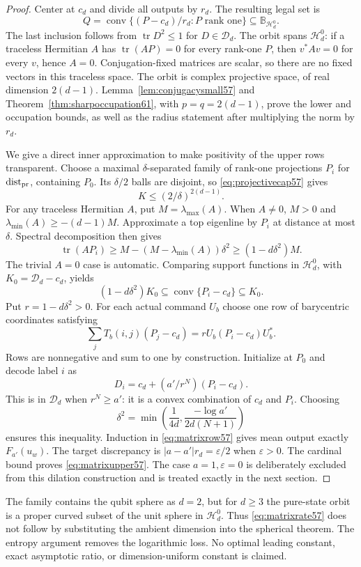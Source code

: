 \begin{proof}
Center at $c_d$ and divide all outputs by $r_d$. The resulting legal set is
\[
 Q=\operatorname{conv}\{(P-c_d)/r_d:P\text{ rank one}\}\subseteq\mathbb B_{\mathcal H_d^0}.
\]
The last inclusion follows from $\operatorname{tr}D^2\le1$ for $D\in\mathcal D_d$. The orbit spans $\mathcal H_d^0$: if a traceless Hermitian $A$ has $\operatorname{tr}(AP)=0$ for every rank-one $P$, then $v^*Av=0$ for every $v$, hence $A=0$. Conjugation-fixed matrices are scalar, so there are no fixed vectors in this traceless space. The orbit is complex projective space, of real dimension $2(d-1)$. Lemma~\ref{lem:conjugacysmall57} and Theorem~\ref{thm:sharpoccupation61}, with $p=q=2(d-1)$, prove the lower and occupation bounds, as well as the radius statement after multiplying the norm by $r_d$.

We give a direct inner approximation to make positivity of the upper rows transparent. Choose a maximal $\delta$-separated family of rank-one projections $P_i$ for $\operatorname{dist}_{\rm pr}$, containing $P_0$. Its $\delta/2$ balls are disjoint, so \eqref{eq:projectivecap57} gives
\[
                         K\le(2/\delta)^{2(d-1)}.
\]
For any traceless Hermitian $A$, put $M=\lambda_{\max}(A)$. When $A\ne0$, $M>0$ and $\lambda_{\min}(A)\ge-(d-1)M$. Approximate a top eigenline by $P_i$ at distance at most $\delta$. Spectral decomposition then gives
\begin{equation}\label{eq:matrixsupport57}
 \operatorname{tr}(AP_i)\ge M-(M-\lambda_{\min}(A))\delta^2
                         \ge(1-d\delta^2)M.
\end{equation}
The trivial $A=0$ case is automatic. Comparing support functions in $\mathcal H_d^0$, with $K_0=\mathcal D_d-c_d$, yields
\[
 (1-d\delta^2)K_0\subseteq\operatorname{conv}\{P_i-c_d\}\subseteq K_0.
\]
Put $r=1-d\delta^2>0$. For each actual command $U_b$ choose one row of barycentric coordinates satisfying
\begin{equation}\label{eq:matrixrow57}
 \sum_jT_b(i,j)(P_j-c_d)=rU_b(P_i-c_d)U_b^*.
\end{equation}
Rows are nonnegative and sum to one by construction. Initialize at $P_0$ and decode label $i$ as
\[
                  D_i=c_d+(a'/r^N)(P_i-c_d).
\]
This is in $\mathcal D_d$ when $r^N\ge a'$: it is a convex combination of $c_d$ and $P_i$. Choosing
\[
 \delta^2=\min\left(\frac1{4d},\frac{-\log a'}{2d(N+1)}\right)
\]
ensures this inequality. Induction in \eqref{eq:matrixrow57} gives mean output exactly $F_{a'}(u_w)$. The target discrepancy is $|a-a'|r_d=\varepsilon/2$ when $\varepsilon>0$. The cardinal bound proves \eqref{eq:matrixupper57}. The case $a=1,\varepsilon=0$ is deliberately excluded from this dilation construction and is treated exactly in the next section.
\end{proof}
The family contains the qubit sphere as $d=2$, but for $d\ge3$ the pure-state orbit is a proper curved subset of the unit sphere in $\mathcal H_d^0$. Thus \eqref{eq:matrixrate57} does not follow by substituting the ambient dimension into the spherical theorem. The entropy argument removes the logarithmic loss. No optimal leading constant, exact asymptotic ratio, or dimension-uniform constant is claimed.

